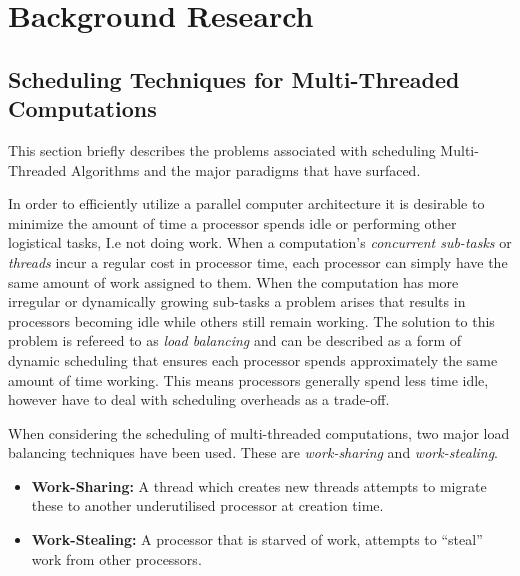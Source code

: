 \chapter{Background Research}

\section{Scheduling Techniques for Multi-Threaded Computations}
This section briefly describes the problems associated with scheduling Multi-Threaded Algorithms and 
the major paradigms that have surfaced.

In order to efficiently utilize a parallel computer architecture it is desirable to minimize
the amount of time a processor spends idle or performing other logistical tasks, I.e not doing work. 
When a computation's \textit{concurrent sub-tasks} or \textit{threads} incur a regular cost in processor
time, each processor can simply have the same amount of work assigned to them. When the computation has
more irregular or dynamically growing sub-tasks a problem arises that results in 
processors becoming idle while others still remain working. The solution to this problem is refereed to as
\textit{load balancing} and can be described as a form of dynamic scheduling that ensures each processor 
spends approximately the same amount of time working. This means processors generally spend
less time idle, however have to deal with scheduling overheads as a trade-off.

When considering the scheduling of multi-threaded computations, two major load balancing techniques have been used.
These are \textit{work-sharing} and \textit{work-stealing}.

\begin{itemize}
\item \textbf{Work-Sharing:} A thread which creates new threads attempts to migrate these to another underutilised processor at creation time. 
\item \textbf{Work-Stealing:} A processor that is starved of work, attempts to ``steal'' work from other processors. 
\end{itemize}

